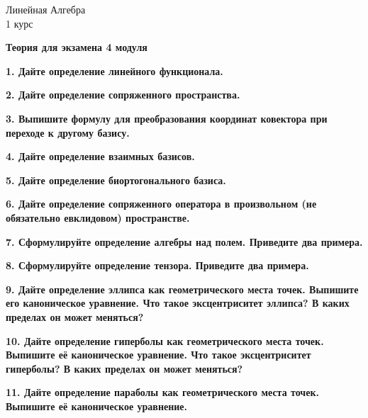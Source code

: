 \documentclass[11pt,a4paper]{article}
\begin{document}
\begin{center}

\begin{huge}
\textsf{Линейная Алгебра\\1 курс}
\end{huge}

\vspace{5mm}

\begin{LARGE}
\textsf{\textbf{Теория для экзамена 4 модуля}}
\end{LARGE}

\end{center}

\textbf{1. Дайте определение линейного функционала.\\}

\textbf{2. Дайте определение сопряженного пространства.\\}

\textbf{3. Выпишите формулу для преобразования координат ковектора при переходе к другому базису.\\}

\textbf{4. Дайте определение взаимных базисов.\\}

\textbf{5. Дайте определение биортогонального базиса.\\}

\textbf{6. Дайте определение сопряженного оператора в произвольном (не обязательно евклидовом) пространстве.\\}

\textbf{7. Сформулируйте определение алгебры над полем. Приведите два примера.\\}

\textbf{8. Сформулируйте определение тензора. Приведите два примера.\\}

\textbf{9. Дайте определение эллипса как геометрического места точек. Выпишите его каноническое уравнение. Что такое эксцентриситет эллипса? В каких пределах он может меняться?\\}

\textbf{10. Дайте определение гиперболы как геометрического места точек. Выпишите её каноническое уравнение. Что такое эксцентриситет гиперболы? В каких пределах он может меняться?\\}

\textbf{11. Дайте определение параболы как геометрического места точек. Выпишите её каноническое уравнение.\\}
\end{document}
